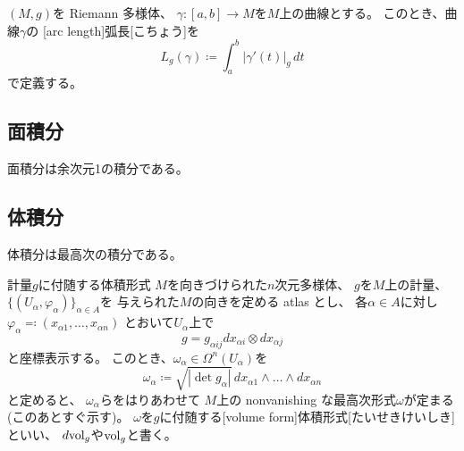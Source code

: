\documentclass[report]{jlreq}
\begin{document}
\begin{definition}[曲線の弧長]
    $(M, g)$を Riemann 多様体、
    $\gamma \colon [a, b] \to M$を$M$上の\smooth 曲線とする。
    このとき、曲線$\gamma$の
    [arc length]{弧長}[こちょう]を
    \begin{equation}
        L_g(\gamma) \coloneqq \int_a^b |\gamma'(t)|_g \, dt
    \end{equation}
    で定義する。
\end{definition}

\begin{example}[単位円周の弧長]
    \TODO{}
\end{example}

\subsection{面積分}

面積分は余次元1の積分である。

\TODO{}

\subsection{体積分}

体積分は最高次の積分である。

\begin{definition}[計量に付随する体積形式]
        {計量$g$に付随する体積形式}
    $M$を向きづけられた$n$次元多様体、
    $g$を$M$上の計量、
    $\{ (U_\alpha, \varphi_\alpha) \}_{\alpha \in A}$を
    与えられた$M$の向きを定める atlas とし、
    各$\alpha \in A$に対し
    $\varphi_\alpha \eqqcolon (x_{\alpha 1}, \dots, x_{\alpha n})$
    とおいて$U_\alpha$上で
    \begin{equation}
        g = g_{\alpha ij} dx_{\alpha i} \otimes dx_{\alpha j}
    \end{equation}
    と座標表示する。
    このとき、$\omega_\alpha \in \Omega^n(U_\alpha)$を
    \begin{equation}
        \omega_\alpha \coloneqq
            \sqrt{|\det g_\alpha|} \, dx_{\alpha 1} \wedge \dots \wedge dx_{\alpha n}
    \end{equation}
    と定めると、
    $\omega_\alpha$らをはりあわせて
    $M$上の nonvanishing な最高次形式$\omega$が定まる (このあとすぐ示す)。
    $\omega$を$g$に付随する[volume form]{体積形式}[たいせきけいしき]といい、
    $d\mathrm{vol}_g$や$\mathrm{vol}_g$と書く。
\end{definition}
\end{document}
